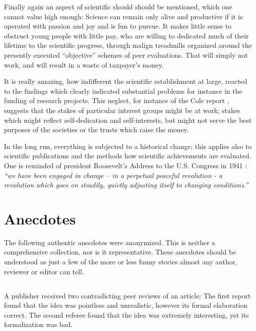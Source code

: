Finally again an aspect of scientific should should be mentioned, which one
cannot value high enough:  Science can remain only alive and
productive if it is operated with passion and joy and is fun to
pursue.  It makes little sense to obstruct young people with
little pay, who are willing
to dedicated much of their lifetime to the scientific progress,
through malign treadmills organized around the presently executed ``objective''
schemes of peer evaluations.  That will simply not work, and will result
in a waste of taxpayer's money.

It is really amazing, how indifferent the scientific establishment at large,
reacted to the findings which clearly indicated substantial problems
for instance in the funding of research projects.
This neglect, for instance of the Cole report
\cite{1981-cole},
suggests that the stakes of particular interest groups might be at work;
stakes which might reflect self-dedication and self-interests, but might
not serve the best purposes of the societies or the trusts which raise the money.

In the long run, everything is subjected to a historical change; this
applies also to scientific publications and the methods how scientific
achievements are evaluated.  One is reminded of president Roosevelt's
Address to the U.S.  Congress in 1941 \cite{RooseveltFD}:  {\em ``we
have been engaged in change -- in a perpetual peaceful revolution - a
revolution which goes on steadily, quietly adjusting itself to changing
conditions.''}

\appendix

\section{Anecdotes}

The following authentic anecdotes were anonymized.  This is neither a
comprehensive collection, nor is it representative.
These anecdotes should be understood as just a few of the more or
less funny stories almost any author, reviewer or editor can tell.


\subsection{} A publisher received two contradicting peer reviews of an
article:  The first report found that the idea was pointless and
unrealistic, however its formal elaboration correct.  The second referee
found that the idea was extremely interesting, yet its formalization was
bad.



